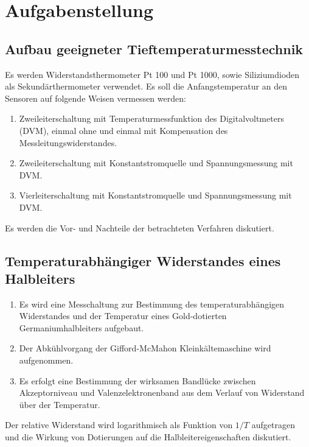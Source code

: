 \documentclass[parskip=half, a4paper,twoside,final]{article}
\begin{document}
\section{Aufgabenstellung} \label{sec:Aufgabenstellung}

\subsection{Aufbau geeigneter Tieftemperaturmesstechnik}

Es werden Widerstandsthermometer Pt 100 und Pt 1000, sowie Siliziumdioden als Sekundärthermometer verwendet. Es soll die Anfangstemperatur an den Sensoren auf folgende Weisen vermessen werden:
\begin{enumerate}
  \item Zweileiterschaltung mit Temperaturmessfunktion des Digitalvoltmeters (DVM), einmal ohne und einmal mit Kompensation des Messleitungswiderstandes.
  \item Zweileiterschaltung mit Konstantstromquelle und Spannungsmessung mit DVM.
  \item Vierleiterschaltung mit Konstantstromquelle und Spannungsmessung mit DVM.
\end{enumerate}

Es werden die Vor- und Nachteile der betrachteten Verfahren diskutiert.

\subsection{Temperaturabhängiger Widerstandes eines Halbleiters}

\begin{enumerate}
  \item Es wird eine Messchaltung zur Bestimmung des temperaturabhängigen Widerstandes und der Temperatur eines Gold-dotierten Germaniumhalbleiters aufgebaut.
  \item Der Abkühlvorgang der Gifford-McMahon Kleinkältemaschine wird aufgenommen.
  \item Es erfolgt eine Bestimmung der wirksamen Bandlücke zwischen Akzeptorniveau und Valenzelektronenband aus dem Verlauf von Widerstand über der Temperatur.
\end{enumerate}
Der relative Widerstand wird logarithmisch als Funktion von $1/T$ aufgetragen und die Wirkung von Dotierungen auf die Halbleitereigenschaften diskutiert.
\end{document}
